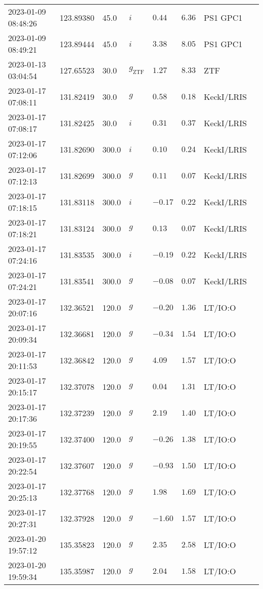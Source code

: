 \documentclass{nature_plusfigure}
\begin{document}
\begin{supplement}
\begin{center}
\begin{longtable}{llllllll}
2023-01-09 08:48:26 & 123.89380 & 45.0 & $i$ & $0.44$ & $6.36$ & PS1 GPC1 &  \\ 
2023-01-09 08:49:21 & 123.89444 & 45.0 & $i$ & $3.38$ & $8.05$ & PS1 GPC1 &  \\ 
2023-01-13 03:04:54 & 127.65523 & 30.0 & ${g}_\mathrm{ZTF}$ & $1.27$ & $8.33$ & ZTF &  \\ 
2023-01-17 07:08:11 & 131.82419 & 30.0 & $g$ & $0.58$ & $0.18$ & KeckI/LRIS &  \\ 
2023-01-17 07:08:17 & 131.82425 & 30.0 & $i$ & $0.31$ & $0.37$ & KeckI/LRIS &  \\ 
2023-01-17 07:12:06 & 131.82690 & 300.0 & $i$ & $0.10$ & $0.24$ & KeckI/LRIS &  \\ 
2023-01-17 07:12:13 & 131.82699 & 300.0 & $g$ & $0.11$ & $0.07$ & KeckI/LRIS &  \\ 
2023-01-17 07:18:15 & 131.83118 & 300.0 & $i$ & $-0.17$ & $0.22$ & KeckI/LRIS &  \\ 
2023-01-17 07:18:21 & 131.83124 & 300.0 & $g$ & $0.13$ & $0.07$ & KeckI/LRIS &  \\ 
2023-01-17 07:24:16 & 131.83535 & 300.0 & $i$ & $-0.19$ & $0.22$ & KeckI/LRIS &  \\ 
2023-01-17 07:24:21 & 131.83541 & 300.0 & $g$ & $-0.08$ & $0.07$ & KeckI/LRIS &  \\ 
2023-01-17 20:07:16 & 132.36521 & 120.0 & $g$ & $-0.20$ & $1.36$ & LT/IO:O &  \\ 
2023-01-17 20:09:34 & 132.36681 & 120.0 & $g$ & $-0.34$ & $1.54$ & LT/IO:O &  \\ 
2023-01-17 20:11:53 & 132.36842 & 120.0 & $g$ & $4.09$ & $1.57$ & LT/IO:O &  \\ 
2023-01-17 20:15:17 & 132.37078 & 120.0 & $g$ & $0.04$ & $1.31$ & LT/IO:O &  \\ 
2023-01-17 20:17:36 & 132.37239 & 120.0 & $g$ & $2.19$ & $1.40$ & LT/IO:O &  \\ 
2023-01-17 20:19:55 & 132.37400 & 120.0 & $g$ & $-0.26$ & $1.38$ & LT/IO:O &  \\ 
2023-01-17 20:22:54 & 132.37607 & 120.0 & $g$ & $-0.93$ & $1.50$ & LT/IO:O &  \\ 
2023-01-17 20:25:13 & 132.37768 & 120.0 & $g$ & $1.98$ & $1.69$ & LT/IO:O &  \\ 
2023-01-17 20:27:31 & 132.37928 & 120.0 & $g$ & $-1.60$ & $1.57$ & LT/IO:O &  \\ 
2023-01-20 19:57:12 & 135.35823 & 120.0 & $g$ & $2.35$ & $2.58$ & LT/IO:O &  \\ 
2023-01-20 19:59:34 & 135.35987 & 120.0 & $g$ & $2.04$ & $1.58$ & LT/IO:O &  \\ 

\end{longtable}
\end{center}
\end{supplement}
\end{document}
